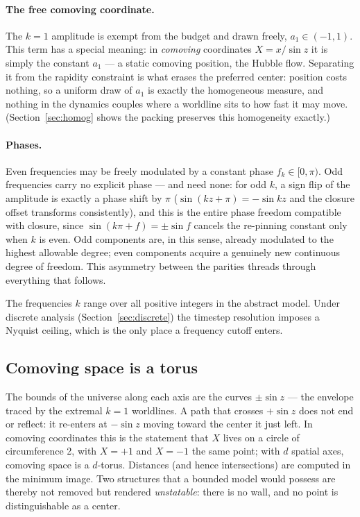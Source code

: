 \documentclass[11pt]{article}
\begin{document}
\paragraph{The free comoving coordinate.} The $k=1$ amplitude is exempt from
the budget and drawn freely, $a_1 \in (-1,1)$. This term has a special
meaning: in \emph{comoving} coordinates $X = x/\sin z$ it is simply the
constant $a_1$ --- a static comoving position, the Hubble flow. Separating it
from the rapidity constraint is what erases the preferred center: position
costs nothing, so a uniform draw of $a_1$ is exactly the homogeneous measure,
and nothing in the dynamics couples where a worldline sits to how fast it may
move. (Section~\ref{sec:homog} shows the packing preserves this
homogeneity exactly.)

\paragraph{Phases.} Even frequencies may be freely modulated by a constant
phase $f_k \in [0,\pi)$. Odd frequencies carry no explicit phase --- and need
none: for odd $k$, a sign flip of the amplitude is exactly a phase shift by
$\pi$ ($\sin(kz + \pi) = -\sin kz$ and the closure offset transforms
consistently), and this is the entire phase freedom compatible with closure,
since $\sin(k\pi + f) = \pm \sin f$ cancels the re-pinning constant only when
$k$ is even. Odd components are, in this sense, already modulated to the
highest allowable degree; even components acquire a genuinely new continuous
degree of freedom. This asymmetry between the parities threads through
everything that follows.

The frequencies $k$ range over all positive integers in the abstract model.
Under discrete analysis (Section~\ref{sec:discrete}) the timestep resolution
imposes a Nyquist ceiling, which is the only place a frequency cutoff enters.

\subsection{Comoving space is a torus}
\label{sec:torus}

The bounds of the universe along each axis are the curves $\pm\sin z$ --- the
envelope traced by the extremal $k = 1$ worldlines. A path that crosses
$+\sin z$ does not end or reflect: it re-enters at $-\sin z$ moving toward
the center it just left. In comoving coordinates this is the statement that
$X$ lives on a circle of circumference 2, with $X = +1$ and $X = -1$ the
same point; with $d$ spatial axes, comoving space is a $d$-torus. Distances
(and hence intersections) are computed in the minimum image. Two structures
that a bounded model would possess are thereby not removed but rendered
\emph{unstatable}: there is no wall, and no point is distinguishable as a
center.
\end{document}
